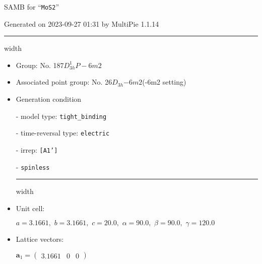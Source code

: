 \documentclass[fleqn,10pt,landscape]{article}
\begin{document}
\setcounter{MaxMatrixCols}{16}

\setlength{\baselineskip}{16pt}
\footnotesize
\begin{center}
\LARGE
SAMB for ``\texttt{MoS2}''
\end{center}
\begin{flushright}
Generated on 2023-09-27 01:31 by MultiPie 1.1.14
\end{flushright}
\vspace{1cm}


 \hfil \hrule height 1mm width \textwidth \hfil

\begin{itemize}
\item Group: No. 187\quad$D_{3h}^{1}$\quad$P-6m2$\quad[ hexagonal ]

\item Associated point group: No. 26\quad$D_{3h}$\quad$-6m2$\quad(-6m2 setting)\quad[ hexagonal ]

\vspace{5mm}

\item Generation condition

\quad - model type: \texttt{tight_binding}

\quad - time-reversal type: \texttt{electric}

\quad - irrep: \texttt{[A1']}

\quad - \texttt{spinless}


 \hfil \hrule height 1mm width \textwidth \hfil

\item Unit cell:

\quad $a=3.1661,\,\, b=3.1661,\,\, c=20.0,\,\, \alpha=90.0,\,\, \beta=90.0,\,\, \gamma=120.0$

\item Lattice vectors:

\quad $\bm{a}_1=\begin{pmatrix} 3.1661 & 0 & 0 \end{pmatrix}$


\end{itemize}
\end{document}
